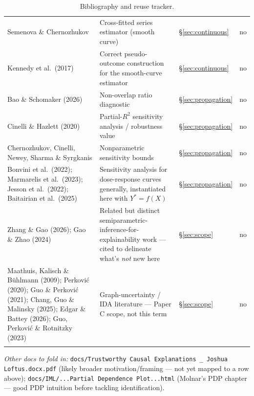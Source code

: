\begin{longtable}{@{}p{3.6cm}p{5.6cm}p{2.1cm}p{1.4cm}@{}}
Semenova \& Chernozhukov & Cross-fitted series estimator (smooth curve) &
  \S\ref{sec:continuous} & no \\
Kennedy et al.\ (2017) & Correct pseudo-outcome construction for the
  smooth-curve estimator & \S\ref{sec:continuous} & no \\
Bao \& Schomaker (2026) & Non-overlap ratio diagnostic &
  \S\ref{sec:propagation} & no \\
Cinelli \& Hazlett (2020) & Partial-$R^2$ sensitivity analysis / robustness
  value & \S\ref{sec:propagation} & no \\
Chernozhukov, Cinelli, Newey, Sharma \& Syrgkanis & Nonparametric
  sensitivity bounds & \S\ref{sec:propagation} & no \\
Bonvini et al.\ (2022); Marmarelis et al.\ (2023); Jesson et al.\ (2022);
  Baitairian et al.\ (2025) & Sensitivity analysis for dose-response curves
  generally, instantiated here with $Y^*=f(X)$ & \S\ref{sec:propagation} &
  no \\
Zhang \& Gao (2026); Gao \& Zhao (2024) & Related but distinct
  semiparametric-inference-for-explainability work --- cited to delineate
  what's \emph{not} new here & \S\ref{sec:scope} & no \\
Maathuis, Kalisch \& B\"uhlmann (2009); Perkovi\'c (2020); Guo \&
  Perkovi\'c (2021); Chang, Guo \& Malinsky (2025); Edgar \& Battey (2026);
  Guo, Perkovi\'c \& Rotnitzky (2023) & Graph-uncertainty / IDA literature
  --- Paper C scope, not this term & \S\ref{sec:scope} & no \\
\bottomrule
\caption{Bibliography and reuse tracker.}
\label{tab:papers}
\end{longtable}

\emph{Other docs to fold in:} \texttt{docs/Trustworthy Causal Explanations
\_ Joshua Loftus.docx.pdf} (likely broader motivation/framing --- not yet
mapped to a row above); \texttt{docs/IML/...Partial Dependence Plot...html}
(Molnar's PDP chapter --- good PDP intuition before tackling
identification).
